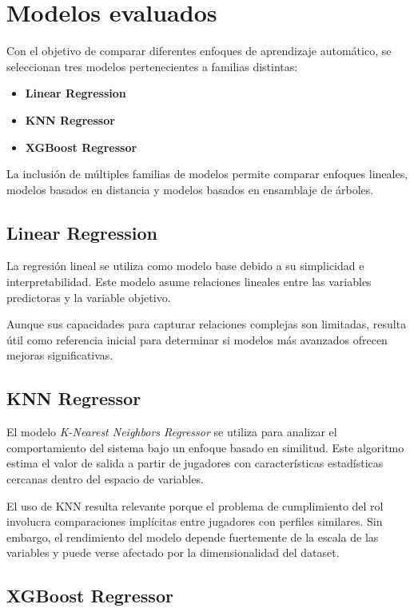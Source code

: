 \documentclass{ULBreport} %
\begin{document}
\section{Modelos evaluados}

Con el objetivo de comparar diferentes enfoques de aprendizaje automático, se seleccionan tres modelos pertenecientes a familias distintas:

\begin{itemize}
    \item \textbf{Linear Regression}
    \item \textbf{KNN Regressor}
    \item \textbf{XGBoost Regressor}
\end{itemize}

La inclusión de múltiples familias de modelos permite comparar enfoques lineales, modelos basados en distancia y modelos basados en ensamblaje de árboles.

\subsection{Linear Regression}

La regresión lineal se utiliza como modelo base debido a su simplicidad e interpretabilidad. Este modelo asume relaciones lineales entre las variables predictoras y la variable objetivo.

Aunque sus capacidades para capturar relaciones complejas son limitadas, resulta útil como referencia inicial para determinar si modelos más avanzados ofrecen mejoras significativas.

\subsection{KNN Regressor}

El modelo \textit{K-Nearest Neighbors Regressor} se utiliza para analizar el comportamiento del sistema bajo un enfoque basado en similitud. Este algoritmo estima el valor de salida a partir de jugadores con características estadísticas cercanas dentro del espacio de variables.

El uso de KNN resulta relevante porque el problema de cumplimiento del rol involucra comparaciones implícitas entre jugadores con perfiles similares. Sin embargo, el rendimiento del modelo depende fuertemente de la escala de las variables y puede verse afectado por la dimensionalidad del dataset.

\subsection{XGBoost Regressor}
\end{document}
